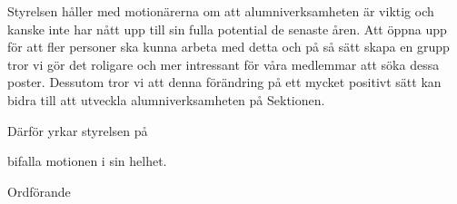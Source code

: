 \documentclass[../_main/handlingar.tex]{subfiles}
\begin{document}
\motionssvar

Styrelsen håller med motionärerna om att alumniverksamheten är viktig och kanske inte har nått upp till sin fulla potential de senaste åren. Att öppna upp för att fler personer ska kunna arbeta med detta och på så sätt skapa en grupp tror vi gör det roligare och mer intressant för våra medlemmar att söka dessa poster. Dessutom tror vi att denna förändring på ett mycket positivt sätt kan bidra till att utveckla alumniverksamheten på Sektionen.

Därför yrkar styrelsen på
\begin{attsatser}
    \att bifalla motionen i sin helhet.
\end{attsatser}

\begin{signatures}{1}
    \ist
    \signature{Fredrik Peterson}{Ordförande}
\end{signatures}
\end{document}

